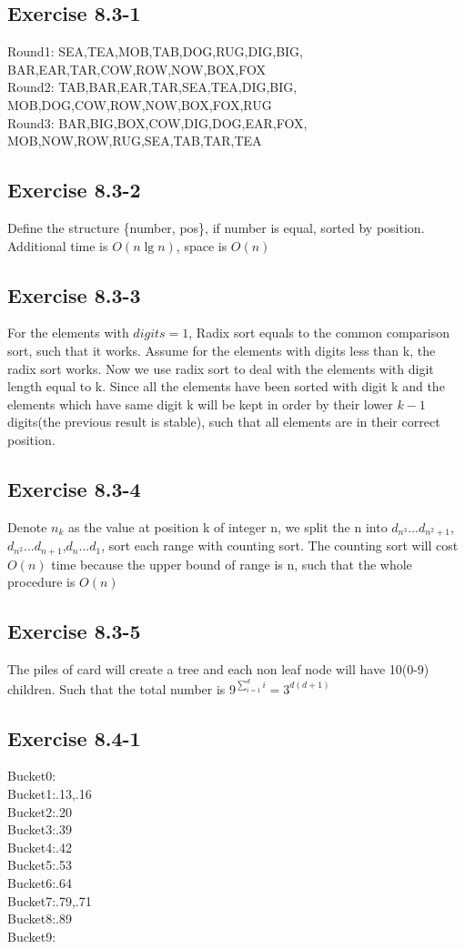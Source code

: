 \documentclass[12pt]{article}
\theoremstyle{definition}
\theoremstyle{remark}
\begin{document}
\subsection*{Exercise 8.3-1}
Round1: SEA,TEA,MOB,TAB,DOG,RUG,DIG,BIG,\\BAR,EAR,TAR,COW,ROW,NOW,BOX,FOX\\
Round2: TAB,BAR,EAR,TAR,SEA,TEA,DIG,BIG,\\MOB,DOG,COW,ROW,NOW,BOX,FOX,RUG\\
Round3: BAR,BIG,BOX,COW,DIG,DOG,EAR,FOX,\\MOB,NOW,ROW,RUG,SEA,TAB,TAR,TEA
\subsection*{Exercise 8.3-2}
Define the structure \{number, pos\}, if number is equal, sorted by position. Additional time is $O(n\lg n)$, space is $O(n)$
\subsection*{Exercise 8.3-3}
For the elements with $digits=1$, Radix sort equals to the common comparison sort, such that it works. Assume for the elements with digits less than k, the radix sort works. Now we use radix sort to deal with the elements with digit length equal to k. Since all the elements have been sorted with digit k and the elements which have same digit k will be kept in order by their lower $k-1$ digits(the previous result is stable), such that all elements are in their correct position.
\subsection*{Exercise 8.3-4}
Denote $n_k$ as the value at position k of integer n, we split the n into $d_{n^3}...d_{n^2+1}$,\\$d_{n^2}...d_{n+1}$,$d_{n}...d_{1}$, sort each range with counting sort. The counting sort will cost $O(n)$ time because the upper bound of range is n, such that the whole procedure is $O(n)$
\subsection*{Exercise 8.3-5}
The piles of card will create a tree and each non leaf node will have 10(0-9) children. Such that the total number is $9^{\sum_{i=1}^di}=3^{d(d+1)}$
\subsection*{Exercise 8.4-1}
Bucket0:\\
Bucket1:.13,.16\\
Bucket2:.20\\
Bucket3:.39\\
Bucket4:.42\\
Bucket5:.53\\
Bucket6:.64\\
Bucket7:.79,.71\\
Bucket8:.89\\
Bucket9:\\
\end{document}
